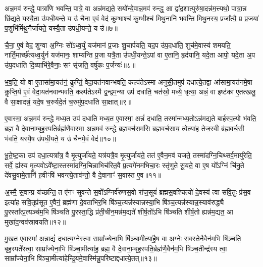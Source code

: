 अन्न॒मव॑ रुन्द्धे॒ पात्रा॑णि भवन्ति॒ पात्रे॒ वा अन्न॑मद्यते॒ सयो᳚न्ये॒वान्न॒मव॑ रुन्द्ध॒ आ द्वा॑द॒शात्पुरु॑षा॒दन्न॑म॒त्त्यथो॒ पात्रा॒न्न छि॑द्यते॒ यस्यै॒ता उ॑पधी॒यन्ते॒ य उ॑ चैना ए॒वं वेद॑ कु॒म्भाश्च॑ कु॒म्भीश्च॑ मिथु॒नानि॑ भवन्ति मिथु॒नस्य॒ प्रजा᳚त्यै॒ प्र प्र॒जया॑ प॒शुभि॑र्मिथु॒नैर्जा॑यते॒ यस्यै॒ता उ॑पधी॒यन्ते॒ य उ॑॥७॥

चै॒ना॒ ए॒वं वेद॒ शुग्वा अ॒ग्निः सो᳚\-ऽध्व॒र्युं यज॑मानं प्र॒जाः शु॒चार्प॑यति॒ यद॒प उ॑प॒दधा॑ति॒ शुच॑मे॒वास्य॑ शमयति॒ नार्ति॒मार्च्छ॑त्यध्व॒र्युर्न यज॑मानः॒ शाम्य॑न्ति प्र॒जा यत्रै॒ता उ॑पधी॒यन्ते॒\-ऽपां वा ए॒तानि॒ हृद॑यानि॒ यदे॒ता आपो॒ यदे॒ता अ॒प उ॑प॒दधा॑ति दि॒व्याभि॑रे॒वैनाः॒ सꣳ सृ॑जति॒ वर्\mbox{}षु॑कः प॒र्जन्यः॑॥८॥

भ॒व॒ति॒ यो वा ए॒तासा॑मा॒यत॑नं॒ कॢप्तिं॒ वेदा॒यत॑नवान्भवति॒ कल्प॑ते\-ऽस्मा अनुसी॒तमुप॑ दधात्ये॒तद्वा आ॑सामा॒यत॑नमे॒षा कॢप्ति॒र्य ए॒वं वेदा॒यत॑नवान्भवति॒ कल्प॑ते\-ऽस्मै द्व॒न्द्वम॒न्या उप॑ दधाति॒ चत॑स्रो॒ मध्ये॒ धृत्या॒ अन्नं॒ वा इष्ट॑का ए॒तत्खलु॒ वै सा॒क्षादन्नं॒ यदे॒ष च॒रुर्यदे॒तं च॒रुमु॑प॒दधा॑ति सा॒क्षात्॥९॥

ए॒वास्मा॒ अन्न॒मव॑ रुन्द्धे मध्य॒त उप॑ दधाति मध्य॒त ए॒वास्मा॒ अन्नं॑ दधाति॒ तस्मा᳚न्मध्य॒तो\-ऽन्न॑मद्यते बार्\mbox{}हस्प॒त्यो भ॑वति॒ ब्रह्म॒ वै दे॒वाना॒म्बृह॒स्पति॒र्ब्रह्म॑णै॒वास्मा॒ अन्न॒मव॑ रुन्द्धे ब्रह्मवर्च॒सम॑सि ब्रह्मवर्च॒साय॒ त्वेत्या॑ह तेज॒स्वी ब्र॑ह्मवर्च॒सी भ॑वति॒ यस्यै॒ष उ॑पधी॒यते॒ य उ॑ चैनमे॒वं वेद॑॥१०॥

{\anuvakamend[{अ॒मृत॑मस्मै जायते॒ यस्यै॒ता उ॑पधी॒यन्ते॒ य उ॑ प॒र्जन्य॑ उप॒दधा॑ति सा॒क्षात्स॒प्तच॑त्वारिꣳशच्च॥२॥}]}

भू॒ते॒ष्ट॒का उप॑ दधा॒त्यत्रा᳚त्र॒ वै मृ॒त्युर्जा॑यते॒ यत्र॑यत्रै॒व मृ॒त्युर्जाय॑ते॒ तत॑ ए॒वैन॒मव॑ यजते॒ तस्मा॑दग्नि॒चिथ्सर्व॒मायु॑रेति॒ सर्वे॒ ह्य॑स्य मृ॒त्यवो\-ऽवे᳚ष्टा॒स्तस्मा॑दग्नि॒चिन्नाभिच॑रित॒वै प्र॒त्यगे॑नमभिचा॒रः स्तृ॑णुते सू॒यते॒ वा ए॒ष यो᳚\-ऽग्निं चि॑नु॒ते दे॑वसु॒वामे॒तानि॑ ह॒वीꣳषि॑ भवन्त्ये॒ताव॑न्तो॒ वै दे॒वानाꣳ॑ स॒वास्त ए॒व॥११॥

अ॒स्मै॒ स॒वान्प्र य॑च्छन्ति॒ त ए॑नꣳ सुवन्ते स॒वो᳚\-ऽग्निर्व॑रुणस॒वो रा॑ज॒सूयं॑ ब्रह्मस॒वश्चित्यो॑ दे॒वस्य॑ त्वा सवि॒तुः प्र॑स॒व इत्या॑ह सवि॒तृप्र॑सूत ए॒वैनं॒ ब्रह्म॑णा दे॒वता॑भिर॒भि षि॑ञ्च॒त्यन्न॑स्यान्नस्या॒भि षि॑ञ्च॒त्यन्न॑स्यान्न॒स्याव॑रुद्ध्यै पु॒रस्ता᳚त्प्र॒त्यञ्च॑म॒भि षि॑ञ्चति पु॒रस्ता॒द्धि प्र॑ती॒चीन॒मन्न॑म॒द्यते॑ शीर्\mbox{}ष॒तो॑\-ऽभि षि॑ञ्चति शीर्\mbox{}ष॒तो ह्यन्न॑म॒द्यत॒ आ मुखा॑द॒न्वव॑स्रावयति॥१२॥

मु॒ख॒त ए॒वास्मा॑ अ॒न्नाद्यं॑ दधात्य॒ग्नेस्त्वा॒ साम्रा᳚ज्येना॒भि षि॑ञ्चा॒मीत्या॑है॒ष वा अ॒ग्नेः स॒वस्तेनै॒वैन॑म॒भि षि॑ञ्चति॒ बृह॒स्पते᳚स्त्वा॒ साम्रा᳚ज्येना॒भि षि॑ञ्चा॒मीत्या॑ह॒ ब्रह्म॒ वै दे॒वाना॒म्बृह॒स्पति॒र्ब्रह्म॑णै॒वैन॑म॒भि षि॑ञ्च॒तीन्द्र॑स्य त्वा॒ साम्रा᳚ज्येना॒भि षि॑ञ्चा॒मीत्या॑हेन्द्रि॒यमे॒वास्मि॑न्नु॒परि॑ष्टाद्दधात्ये॒तत्॥१३॥

